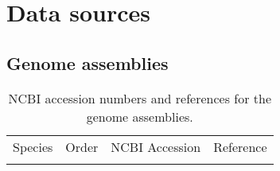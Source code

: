 \clearpage

\section{Data sources}

\subsection{Genome assemblies}

\begin{center}
\tabcolsep=3pt
\begin{longtable}{lllp{12em}}
\caption[NCBI accession numbers and references for the genome assemblies]{NCBI accession numbers and references for the genome assemblies.} \label{tab:genome-assemblies} \\

\footnotesize
\endfirsthead

\multicolumn{2}{c}{%
{\tablename\ \thetable{} --continued}} \\
\toprule
Species & Order  & NCBI Accession & Reference \\
\midrule
\endhead

\bottomrule
\endfoot



\end{longtable}
\end{center}
